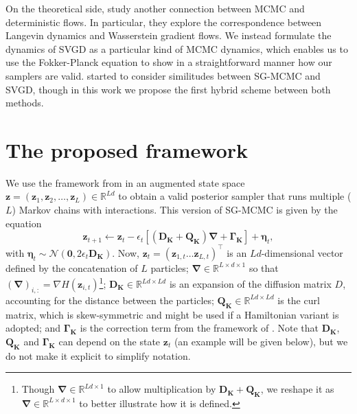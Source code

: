 On the theoretical side, \cite{chen2018unified} study another connection between MCMC and deterministic flows. In particular, they explore the correspondence between Langevin dynamics and Wasserstein gradient flows.
We instead formulate the dynamics of SVGD as a particular kind of MCMC dynamics, which enables us to use the Fokker-Planck equation to show in a straightforward manner how our samplers are valid. \cite{liu2017stein} started to consider similitudes between SG-MCMC and SVGD, though in this work we propose the first hybrid scheme between both methods.



\section{The proposed framework}\label{sec:framework}

We use the framework from \cite{ma2015complete} in an augmented state space $\bm{z} = \left( \bm{z}_{1}, \bm{z}_{2}, \ldots,\bm{z}_{L}\right) \in \mathbb{R}^{Ld}$ to obtain a valid posterior sampler that runs multiple ($L$) Markov chains with interactions. This version of SG-MCMC is given by the equation
\begin{equation}\label{eq:general}
\bm{z}_{t+1} \leftarrow \bm{z}_t -\epsilon_t \left[ (\mathbf{\mathbf{D_K}} + \mathbf{Q_K})\mathbf{\nabla} + \mathbf{\Gamma_K} \right] + \bm{\eta}_t,
\end{equation}
with $\bm{\eta}_t \sim \mathcal{N}(\mathbf{0}, 2\epsilon_t \mathbf{\mathbf{D_K}})$.
Now, $\bm{z}_t = \left(\bm{z}_{1,t} \ldots  \bm{z}_{L,t} \right)^\top$ is an $Ld$-dimensional vector defined by the concatenation of $L$ particles; $\mathbf{\nabla} \in \mathbb{R}^{L \times d \times 1}$ so that $(\mathbf{\nabla})_{i,:} = \nabla H(\bm{z}_{i,t})$\footnote{Though $\mathbf{\nabla} \in \mathbb{R}^{L d \times 1}$ to allow multiplication by $\mathbf{D_K} + \mathbf{Q_K}$, we reshape it as $\mathbf{\nabla} \in \mathbb{R}^{L\times d \times 1}$ to better illustrate how it is defined.}; $\mathbf{D_K} \in \mathbb{R}^{Ld\times Ld}$ is an expansion of the diffusion matrix $D$, accounting for the distance between the particles; $\mathbf{Q_K} \in \mathbb{R}^{Ld\times Ld}$ is the curl matrix, which is skew-symmetric and might be used if a Hamiltonian variant is adopted; and $\mathbf{\Gamma_K}$ is the correction term from the framework of \cite{ma2015complete}. Note that $\mathbf{D_K}$, $\mathbf{Q_K}$ and $\mathbf{\Gamma_K}$ can depend on the state $\bm{z}_t$ (an example will be given below), but we do not make it explicit to simplify notation.

